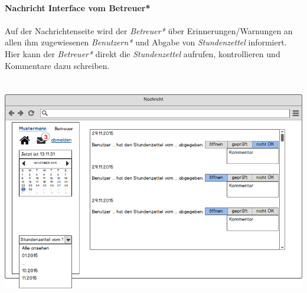 \newpage
\textbf{\\Nachricht Interface vom Betreuer*}\\
\\
Auf der Nachrichtenseite wird der \emph{Betreuer*} über Erinnerungen/Warnungen an allen ihm zugewiesenen \emph{Benutzern*} und Abgabe von \emph{Stundenzettel} informiert.\\
Hier kann der \emph{Betreuer*} direkt die \emph{Stundenzettel} aufrufen, kontrollieren und Kommentare dazu schreiben.\\
\\
\\
\includegraphics[width=\linewidth]{UI/Betreuer/Nachricht.png}

\newpage
